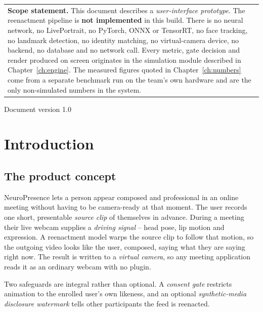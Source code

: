 \documentclass[11pt,a4paper]{report}
\begin{document}
\begin{titlepage}
\begin{tabularx}{0.94\linewidth}{|>{\hspace{5pt}}X<{\hspace{5pt}}|}
\hline
\rule{0pt}{3.2ex}%
{\bfseries\color{npDanger} Scope statement.}
This document describes a \emph{user-interface prototype}. The reenactment
pipeline is \textbf{not implemented} in this build. There is no neural
network, no LivePortrait, no PyTorch, ONNX or TensorRT, no face tracking, no
landmark detection, no identity matching, no virtual-camera device, no
backend, no database and no network call. Every metric, gate decision and
render produced on screen originates in the simulation module described in
Chapter~\ref{ch:engine}. The measured figures quoted in Chapter~\ref{ch:numbers}
come from a separate benchmark run on the team's own hardware and are the
only non-simulated numbers in the system.\par\medskip
\hline
\end{tabularx}

\vspace{14pt}
{\small\color{npMuted}Document version 1.0}
\end{titlepage}

\tableofcontents
\cleardoublepage

\chapter{Introduction}

\section{The product concept}

NeuroPresence lets a person appear composed and professional in an online
meeting without having to be camera-ready at that moment. The user records one
short, presentable \emph{source clip} of themselves in advance. During a
meeting their live webcam supplies a \emph{driving signal} -- head pose, lip
motion and expression. A reenactment model warps the source clip to follow that
motion, so the outgoing video looks like the user, composed, saying what they
are saying right now. The result is written to a \emph{virtual camera}, so any
meeting application reads it as an ordinary webcam with no plugin.

Two safeguards are integral rather than optional. A \emph{consent gate}
restricts animation to the enrolled user's own likeness, and an optional
\emph{synthetic-media disclosure watermark} tells other participants the feed
is reenacted.
\end{document}
